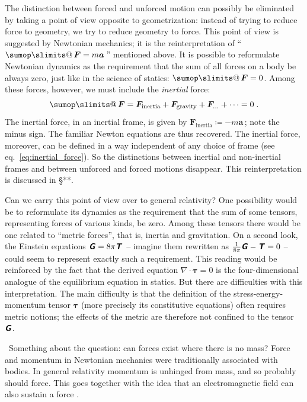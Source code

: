 \documentclass[\ifafour a4paper,12pt,\else a5paper,10pt,\fi%
onecolumn,oneside,article,%
british%
]{memoir}
\makeatletter
\theoremstyle{remark}
\theoremstyle{innote}
\def\sum{\DOTSI\sumop\slimits@}
\newcommand*{\mathte}[1]{\textbf{\textit{\textsf{#1}}}}
\newcommand*{\defd}{\coloneqq}
\renewcommand*{\|}[1][]{\nonscript\,#1\vert\nonscript\;\mathopen{}}
\newcommand*{\sect}{\S}%
\newcommand*{\eqn}{eq.}%
\newcommand*{\tsum}{\mathop{\textstyle\sum}\nolimits}
\newcommand*{\puzzle}{{\fontencoding{U}\fontfamily{fontawesometwo}\selectfont\symbol{225}}}
\newcommand{\mynote}[1]{ {\color{notecolour}\puzzle\ #1}}
\newcommand*{\yGG}{G}
\newcommand*{\yG}{\mathte{\yGG}}
\newcommand*{\yTT}{\tau}
\newcommand*{\yT}{\bm{\yTT}}
\newcommand*{\yTTf}{T}
\newcommand*{\yTf}{\mathte{\yTTf}}
\newcommand*{\ynab}{\nabla}
\makeatother
\begin{document}
The distinction between forced and unforced motion can possibly be
eliminated by taking a point of view opposite to geometrization: instead of
trying to reduce force to geometry, we try to reduce geometry to force.
This point of view is suggested by Newtonian mechanics; it is the
reinterpretation of \enquote{\,$\tsum\bm{F} = m\bm{a}$\,} mentioned above.
It is possible to reformulate Newtonian dynamics as the requirement that
the sum of all forces on a body be always zero, just like in the science of
statics: $\tsum \bm{F} = 0$. Among these forces, however, we must include
the \emph{inertial} force:
\[\tsum \bm{F} = \bm{F}_{\text{inertia}} + \bm{F}_{\text{gravity}}
  + \bm{F}_{\dotso} + \dotsb = 0\;.\] The inertial force, in an inertial
frame, is given by $\bm{F}_{\text{inertia}} \defd -m \bm{a}$\,; note the
minus sign. The familiar Newton equations are thus recovered. The inertial
force, moreover, can be defined in a way independent of any choice of frame
(see \eqn~\eqref{eq:inertial_force}). So the distinctions between inertial
and non-inertial frames and between unforced and forced motions disappear.
This reinterpretation is discussed in \sect***.

Can we carry this point of view over to general relativity? One possibility
would be to reformulate its dynamics as the requirement that the sum of
some tensors, representing forces of various kinds, be zero. Among these
tensors there would be one related to \enquote{metric forces}, that is,
inertia and gravitation. On a second look, the Einstein equations
$\yG = 8\pi\yTf$ -- imagine them rewritten as $\frac{1}{8\pi}\yG - \yTf=0$
-- could seem to represent exactly such a requirement. This reading would
be reinforced by the fact that the derived equation $\ynab\cdot\yT = 0$ is
the four-dimensional analogue of the equilibrium equation in statics. But
there are difficulties with this interpretation. The main difficulty is
that the definition of the stress-energy-momentum tensor $\yT$ (more
precisely its constitutive equations) often requires metric notions; the
effects of the metric are therefore not confined to the tensor $\yG$.

\bigskip

\mynote{Something about the question: can forces exist where there is no
  mass? Force and momentum in Newtonian mechanics were traditionally
  associated with bodies. In general relativity momentum is unhinged from
  mass, and so probably should force. This goes together with the idea that
  an electromagnetic field can also sustain a force \cites[\sect~158,
  pp.~534--535]{page1928_r1958}{ericksen2007}.}
\end{document}
